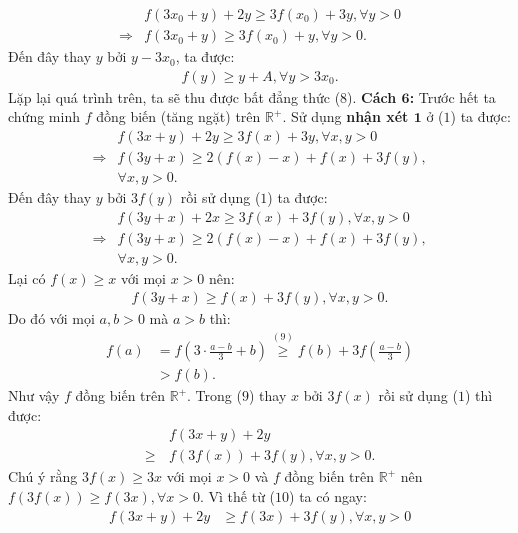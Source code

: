 \begin{multicols}{2}
	\begin{align*}
		&f(3{x_0} + y) + 2y \ge 3f({x_0}) + 3y,\forall y > 0\\
		\Rightarrow &f(3{x_0} + y) \ge 3f({x_0}) + y,\forall y > 0.
	\end{align*}
	Đến đây thay $y$ bởi $y - 3x_0$, ta được: 
	\begin{align*}
		f(y) \ge y + A,\forall y > 3{x_0}.
	\end{align*}
	Lặp lại quá trình trên, ta sẽ thu được bất đẳng thức ($8$).
	\vskip 0.1cm
	\textbf{\color{hoccungpi}Cách $\pmb6$:}
	\vskip 0.1cm     
	Trước hết ta chứng minh  $f$ đồng biến (tăng ngặt) trên $\mathbb{R^+}$.
	\vskip 0.1cm 
	Sử dụng \textbf{\color{hoccungpi}nhận xét $\pmb1$} ở ($1$) ta được:
	\begin{align*}
		&f(3x + y) + 2y \ge 3f(x) + 3y,\forall x,y > 0\\
		\Rightarrow &f(3y + x) \ge 2(f(x) - x) + f(x) + 3f(y),\\
		&\forall x,y > 0.
	\end{align*}
	Đến đây thay $y$ bởi $3f(y)$  rồi sử dụng ($1$) ta được: 
	\begin{align*}
		&f(3y \!+\! x) \!+\! 2x \ge 3f(x) \!+\! 3f(y),\forall x,y > 0\\
		\Rightarrow &f(3y + x) \ge 2(f(x) - x) + f(x) + 3f(y),\\
		&\forall x,y > 0.
	\end{align*}
	Lại có $f(x) \ge x$  với mọi $x > 0$  nên: 
	\begin{align*}
		f(3y + x) \ge f(x) + 3f(y),\forall x,y > 0. \tag{$9$}
	\end{align*}
	Do đó với mọi $a,b > 0$  mà $a > b$  thì: 
	\begin{align*}
		f(a) &= f(3 \cdot \frac{{a - b}}{3} + b)\mathop  \ge \limits^{(9)} f(b) + 3f(\frac{{a - b}}{3})\\
		& > f(b).
	\end{align*}
	Như vậy $f$  đồng biến trên $\mathbb{R^+}$.
	\vskip 0.1cm 
	Trong ($9$)  thay $x$  bởi $3f(x)$  rồi sử dụng ($1$) thì được: 
	\begin{align*}
		&f(3x + y) + 2y \\
		\ge\, &f(3f(x)) + 3f(y),\forall x,y > 0. \tag{$10$}
	\end{align*}
	Chú ý rằng  $3f(x) \ge 3x$ với mọi $x > 0$  và $f$ đồng biến trên $\mathbb{R^+}$  nên  $f(3f(x)) \ge f(3x),\forall x > 0.$ Vì thế từ ($10$) ta có ngay: 
	\begin{align*}
		f(3x + y) + 2y &\ge f(3x) + 3f(y),\forall x,y > 0\\

\end{align*}
\end{multicols}
